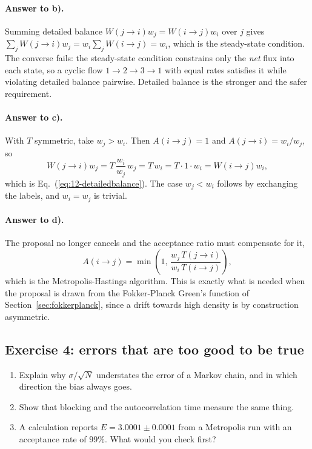 \paragraph{Answer to b).}
Summing detailed balance $W(j\to i)w_j=W(i\to j)w_i$ over $j$ gives
$\sum_j W(j\to i)w_j=w_i\sum_j W(i\to j)=w_i$, which is the steady-state
condition.  The converse fails: the steady-state condition constrains only the
\emph{net} flux into each state, so a cyclic flow
$1\to2\to3\to1$ with equal rates satisfies it while violating detailed balance
pairwise.  Detailed balance is the stronger and the safer requirement.

\paragraph{Answer to c).}
With $T$ symmetric, take $w_j>w_i$.  Then $A(i\to j)=1$ and
$A(j\to i)=w_i/w_j$, so
\[
  W(j\to i)w_j = T\,\frac{w_i}{w_j}\,w_j = T\,w_i
  = T\cdot1\cdot w_i = W(i\to j)w_i ,
\]
which is Eq.~(\ref{eq:12-detailedbalance}).  The case $w_j<w_i$ follows by
exchanging the labels, and $w_i=w_j$ is trivial.

\paragraph{Answer to d).}
The proposal no longer cancels and the acceptance ratio must compensate for
it,
\[
  A(i\to j) = \min\left(1,\,
    \frac{w_j\,T(j\to i)}{w_i\,T(i\to j)}\right),
\]
which is the Metropolis-Hastings algorithm.  This is exactly what is needed
when the proposal is drawn from the Fokker-Planck Green's function of
Section~\ref{sec:fokkerplanck}, since a drift towards high density is by
construction asymmetric.

\subsection*{Exercise 4: errors that are too good to be true}
\label{ex:12-errors}

\begin{enumerate}
  \item[a)] Explain why $\sigma/\sqrt{N}$ understates the error of a Markov
  chain, and in which direction the bias always goes.
  \item[b)] Show that blocking and the autocorrelation time measure the same
  thing.
  \item[c)] A calculation reports $E=3.0001\pm0.0001$ from a Metropolis run
  with an acceptance rate of $99\%$.  What would you check first?
\end{enumerate}

